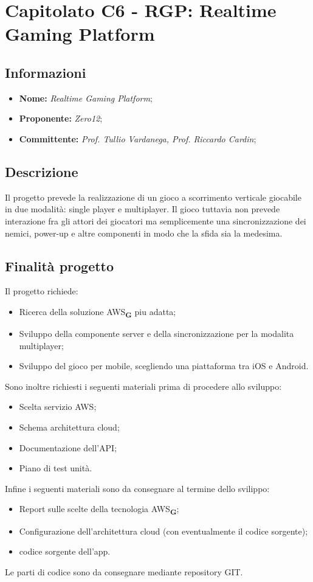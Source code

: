 \section{Capitolato C6 - RGP: Realtime Gaming Platform}
\subsection{Informazioni}
\begin{itemize}
    \item \textbf{Nome:} \textit{Realtime Gaming Platform}; 
    \item \textbf{Proponente:} \textit{Zero12};
    \item \textbf{Committente:} \textit{Prof. Tullio Vardanega, Prof. Riccardo Cardin};
\end{itemize}
\subsection{Descrizione}
Il progetto prevede la realizzazione di un gioco a scorrimento verticale giocabile in due modalit\`a: single player e multiplayer. Il gioco tuttavia non prevede interazione fra gli attori dei giocatori ma semplicemente una sincronizzazione dei nemici, power-up e altre componenti in modo che la sfida sia la medesima.
\subsection{Finalità progetto}
Il progetto richiede:
\begin{itemize}
    \item Ricerca della soluzione AWS\textsubscript{\textbf{G}} piu adatta;
    \item Sviluppo della componente server e della sincronizzazione per la modalita multiplayer;
    \item Sviluppo del gioco per mobile, scegliendo una piattaforma tra iOS e Android.
\end{itemize}
Sono inoltre richiesti i seguenti materiali prima di procedere allo sviluppo:
\begin{itemize}
    \item Scelta servizio AWS;
    \item Schema architettura cloud;
    \item Documentazione dell'API;
    \item Piano di test unit\`a.
\end{itemize}
Infine i seguenti materiali sono da consegnare al termine dello svilippo:
\begin{itemize}
    \item Report sulle scelte della tecnologia AWS\textsubscript{\textbf{G}};
    \item Configurazione dell'architettura cloud (con eventualmente il codice sorgente);
    \item codice sorgente dell'app.
\end{itemize}
Le parti di codice sono da consegnare mediante repository GIT.
